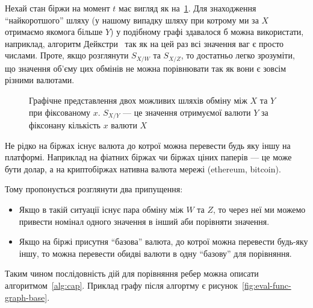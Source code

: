 \documentclass[../index.tex]{subfiles}
\begin{document}
Нехай стан біржи на момент $t$ має вигляд як на~\ref{fig:eval-func-graph}. Для
знаходження ``найкоротшого'' шляху (у нашому випадку шляху при котрому ми за $X$
отримаємо якомога більше $Y$) у подібному графі здавалося б можна використати,
наприклад, алгоритм Дейкстри~\cite{dijkstra} так як на цей раз всі значення ваг
є просто числами. Проте, якщо розглянути $S_{X/W}$ та $S_{X/Z}$, то достатньо
легко зрозуміти, що значення об'єму цих обмінів не можна порівнювати так як вони
є зовсім різними валютами.

\begin{figure}[h]
	\centering
	\caption{Графічне представлення двох можливих шляхів обміну між $X$ та $Y$
		при фіксованому $x$. $S_{X/Y}$ --- це значення отримуємої валюти $Y$ за
		фіксонану кількість $x$ валюти $X$}\label{fig:eval-func-graph}
\end{figure}

Не рідко на біржах існує валюта до котрої можна перевести будь яку іншу на
платформі. Наприклад на фіатних біржах чи біржах ціних паперів --- це може бути
долар, а на криптобіржах нативна валюта мережі (ethereum, bitcoin).

\begin{lemma}
	Тому пропонується розглянути два припущення:

	\begin{itemize}
		\item Якщо в такій ситуації існує пара обміну між $W$ та $Z$, то через неї
		      ми можемо привести номінал одного значення в інший аби порівняти
		      значення.
		\item Якщо на біржі присутня ``базова'' валюта, до котрої можна перевести
		      будь-яку іншу, то можна перевести обидві валюти в одну ``базову'' для
		      порівняння.
	\end{itemize}
\end{lemma}

Таким чином послідовність дій для порівняння ребер можна описати
алгоритмом~\ref{alg:cap}. Приклад графу після алгортму є
рисунок~\ref{fig:eval-func-graph-base}.
\end{document}
